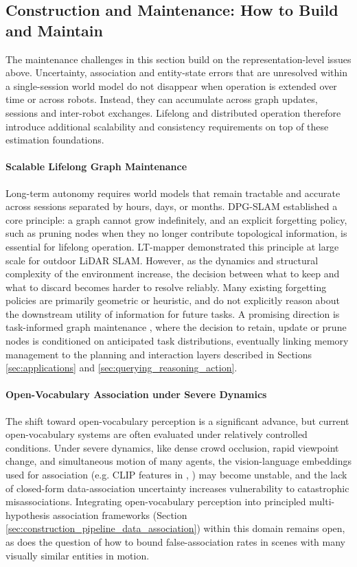 \subsection{Construction and Maintenance: How to Build and Maintain}\label{sec:open_challenges_construction}
The maintenance challenges in this section build on the representation-level issues above. Uncertainty, association and entity-state errors that are unresolved within a single-session world model do not disappear when operation is extended over time or across robots. Instead, they can accumulate across graph updates, sessions and inter-robot exchanges.
Lifelong and distributed operation therefore introduce additional scalability and consistency requirements on top of these estimation foundations.

\paragraph{Scalable Lifelong Graph Maintenance}
Long-term autonomy requires world models that remain tractable and accurate across sessions separated by hours, days, or months.
DPG-SLAM \cite{walcott-bryant_dynamic_2012} established a core principle: a graph cannot grow indefinitely, and an explicit forgetting policy, such as pruning nodes when they no longer contribute topological information, is essential for lifelong operation.
LT-mapper \cite{kim2022lt} demonstrated this principle at large scale for outdoor LiDAR SLAM. 
However, as the dynamics and structural complexity of the environment increase, the decision between what to keep and what to discard becomes harder to resolve reliably.
Many existing forgetting policies are primarily geometric or heuristic, and do not explicitly reason about the downstream utility of information for future tasks.
A promising direction is task-informed graph maintenance \cite{maggio_clio_2024}, where the decision to retain, update or prune nodes is conditioned on anticipated task distributions, eventually linking memory management to the planning and interaction layers described in Sections \ref{sec:applications} and \ref{sec:querying_reasoning_action}.

\paragraph{Open-Vocabulary Association under Severe Dynamics}
The shift toward open-vocabulary perception is a significant advance, but current open-vocabulary systems are often evaluated under relatively controlled conditions.
Under severe dynamics, like dense crowd occlusion, rapid viewpoint change, and simultaneous motion of many agents, the vision-language embeddings used for association (e.g. CLIP features in \cite{yan_dynamic_2025}, \cite{gu_conceptgraphs_2023}) may become unstable, and the lack of closed-form data-association uncertainty increases vulnerability to catastrophic misassociations. 
Integrating open-vocabulary perception into principled multi-hypothesis association frameworks (Section \ref{sec:construction_pipeline_data_association}) within this domain remains open, as does the question of how to bound false-association rates in scenes with many visually similar entities in motion.


